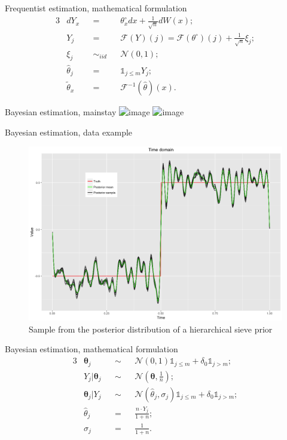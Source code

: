\documentclass[10pt]{beamer}
\begin{document}
\begin{frame}{Frequentist estimation, mathematical formulation}
\begin{alignat*}{3}
& dY_{x} &&=&& \theta^{\circ}_{x} dx + \frac{1}{\sqrt{n}} dW(x);\\
& Y_{j} &&=&& \mathcal{F}(Y)(j) = \mathcal{F}(\theta^{\circ})(j) + \frac{1}{\sqrt{n}} \xi_{j};\\
& \xi_{j} && \sim_{iid} && \mathcal{N}(0,1);\\
& \widehat{\theta}_{j} &&=&& \mathds{1}_{j \leq m} Y_{j};\\
& \widetilde{\theta}_{x} &&=&& \mathcal{F}^{-1}(\widehat{\theta})(x).
\end{alignat*}
\end{frame}

\begin{frame}{Bayesian estimation, mainstay}
\includegraphics<1>[scale=.8]{est-bayes/bayes-est.1}
\includegraphics<2>[scale=.8]{est-bayes/bayes-est.2}
\end{frame}

\begin{frame}{Bayesian estimation, data example}
\begin{figure}
\centering
 \includegraphics[width=.75\linewidth]{sample_bayes.png}
\caption{Sample from the posterior distribution of a hierarchical sieve prior}\label{sample_bayes}
\end{figure}
\end{frame}

\begin{frame}{Bayesian estimation, mathematical formulation}
\begin{alignat*}{3}
& \boldsymbol{\theta}_{j} &&\sim&& \mathcal{N}(0, 1) \mathds{1}_{j \leq m} + \delta_{0}\mathds{1}_{j > m};\\
& Y_{j}\vert \boldsymbol{\theta}_{j} &&\sim&& \mathcal{N}(\boldsymbol{\theta}, \frac{1}{n});\\
& \boldsymbol{\theta}_{j} \vert Y_{j} &&\sim&& \mathcal{N}(\widehat{\theta}_{j}, \sigma_{j}) \mathds{1}_{j \leq m} + \delta_{0}\mathds{1}_{j > m};\\
& \widehat{\theta}_{j} &&=&& \frac{n \cdot Y_{j}}{1 + n};\\
& \sigma_{j} &&=&& \frac{1}{1 + n}.
\end{alignat*}
\end{frame}
\end{document}
